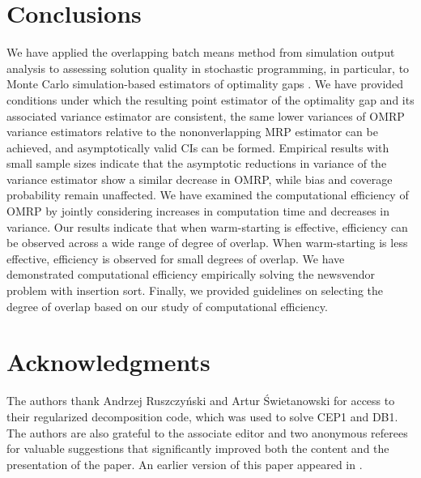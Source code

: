 \documentclass[12pt]{article}
\begin{document}
\section{Conclusions}
\label{sec:concl}

We have applied the overlapping batch means method from simulation output analysis \citep{Meketon1984,Song1992,Welch1987} to assessing solution quality in stochastic programming, in particular, to Monte Carlo simulation-based estimators of optimality gaps \citep{Mak1999}. 
We have provided conditions under which the resulting point estimator of the optimality gap and its associated variance estimator are consistent, the same lower variances of OMRP variance estimators relative to the nononverlapping MRP estimator can be achieved, and asymptotically valid CIs can be formed. 
Empirical results with small sample sizes indicate that the asymptotic reductions in variance of the variance estimator show a similar decrease in OMRP, while bias and coverage probability remain unaffected. 
We have examined the computational efficiency of OMRP by jointly considering increases in computation time and decreases in variance. 
Our results indicate that when warm-starting is effective, efficiency can be observed across a wide range of degree of overlap. 
When warm-starting is less effective, efficiency is observed for small degrees of overlap. 
We have demonstrated computational efficiency empirically solving the newsvendor problem with insertion sort.
Finally, we provided guidelines on selecting the degree of overlap based on our study of computational efficiency. 

 

\section*{Acknowledgments}
The authors thank Andrzej Ruszczy{\'{n}}ski and Artur {\'{S}}wietanowski for
access to their regularized decomposition code, which was used to solve CEP1 and DB1. 
The authors are also grateful to the associate editor and two anonymous referees for valuable suggestions that significantly improved both the content and the presentation of the paper. 
An earlier version of this paper appeared in \citep{love2011overlapping}.



\end{document}
